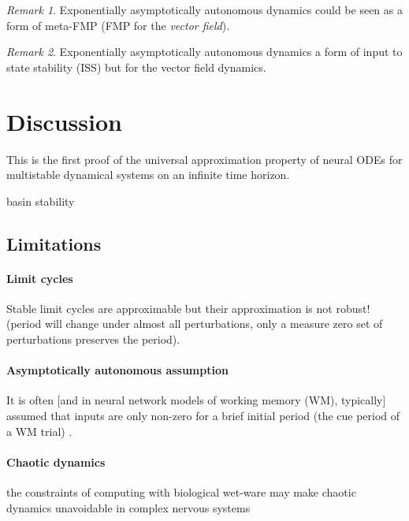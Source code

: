 \documentclass{article}
\theoremstyle{definition} \newtheorem{definition}{Definition}
\theoremstyle{remark} \newtheorem{remark}{Remark}
\newcounter{ct}
\begin{document}
\begin{remark}
Exponentially asymptotically autonomous dynamics could be seen as a form of meta-FMP (FMP for the \emph{vector field}).
\end{remark}

\begin{remark}
Exponentially asymptotically autonomous dynamics a form of input to state stability (ISS\citep{sontag1995iss, sontag1996iss, sontag2008iss}) but for the vector field dynamics.
\end{remark}



\section{Discussion}
This is the first proof of the universal approximation property of neural ODEs for multistable dynamical systems on an infinite time horizon.


basin stability\citep{menck2013basinstability}

\subsection{Limitations}
\paragraph{Limit cycles}
Stable limit cycles are approximable but their approximation is not robust! (period will change under almost all perturbations, only a measure zero set of perturbations preserves the period).


\paragraph{Asymptotically autonomous assumption}
It is often [and in neural network models of working memory (WM), typically] assumed that inputs are only non-zero for a brief initial period (the cue period of a WM trial) \citep{hopfield1982neural, stroud2023infromationloading, stroud2024computational, schimel2024preparation}.

\paragraph{Chaotic dynamics}
the constraints of computing with biological wet-ware may make chaotic dynamics unavoidable in complex nervous systems\citep{hirsch1995computing}
\citep{hoppensteadt2013analysis}
\end{document}
